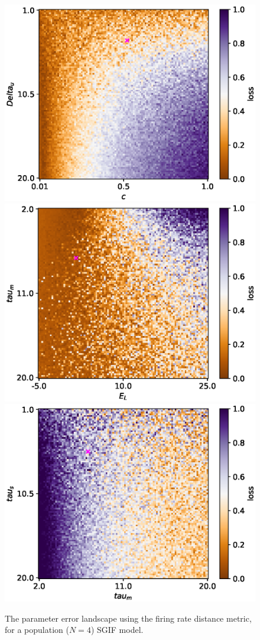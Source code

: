 \documentclass[mphil,deptreport,ianc]{infthesis} %
\begin{document}
\begin{figure}
    \centering
    \vskip -0.1in
    \includegraphics[width=0.32\columnwidth]{figures/param_landscape_heatmaps/microGIF/test_export_2d_heatmap_N_4_loss_c_Delta_u.eps}
    \includegraphics[width=0.32\columnwidth]{figures/param_landscape_heatmaps/microGIF/test_export_2d_heatmap_N_4_loss_E_L_tau_m.eps}
    \includegraphics[width=0.32\columnwidth]{figures/param_landscape_heatmaps/microGIF/test_export_2d_heatmap_N_4_loss_tau_m_tau_s.eps}
    \vskip -0.1in
    \caption{The parameter error landscape using the firing rate distance metric, for a population ($N=4$) SGIF model.}
    \label{fig:p_landscape_hmap_SGIF}
\end{figure}


\end{document}
